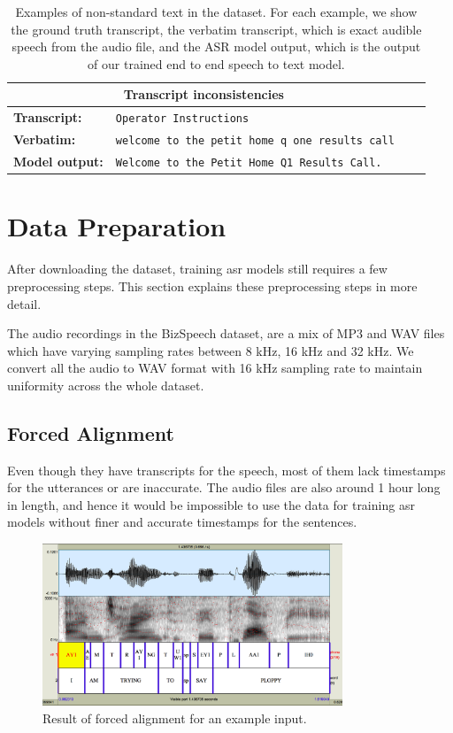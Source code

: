 \begin{table}[ht]
\begin{tabular}{ l p{9.6cm} c c }
 \multicolumn{2}{c}{\textbf{Transcript inconsistencies}} \\
 \hline
 \textbf{Transcript:} & \verb|Operator Instructions| \\ 
 \textbf{Verbatim:} & \verb|welcome to the petit home q one results call| \\
 \textbf{Model output:} & \verb|Welcome to the Petit Home Q1 Results Call.|\\
 \hline\hline
\end{tabular}
\caption{\label{table:examples}Examples of non-standard text in the dataset. For each example, we show the ground truth transcript, the verbatim transcript, which is exact audible speech from the audio file, and the ASR model output, which is the output of our trained end to end speech to text model.}
\end{table}


\section{Data Preparation}
\label{section:dataprep}
After downloading the dataset, training \acrshort{asr} models still requires a few preprocessing steps. This section explains these preprocessing steps in more detail. 

The audio recordings in the BizSpeech dataset, are a mix of MP3 and WAV files which have varying sampling rates between 8 kHz, 16 kHz and 32 kHz. We convert all the audio to WAV format with 16 kHz sampling rate to maintain uniformity across the whole dataset.

\subsection{Forced Alignment}
Even though they have transcripts for the speech, most of them lack timestamps for the utterances or are inaccurate. The audio files are also around 1 hour long in length, and hence it would be impossible to use the data for training \acrshort{asr} models without finer and accurate timestamps for the sentences. 

\begin{figure}[ht]
  \begin{center}
    \includegraphics[width=0.8\textwidth]{images/ploppy.png} 
    \caption{Result of forced alignment for an example input. \cite{Yuan2008SPEAKERCORPUS}}
    \label{fig:p2fa}
  \end{center}
\end{figure}

